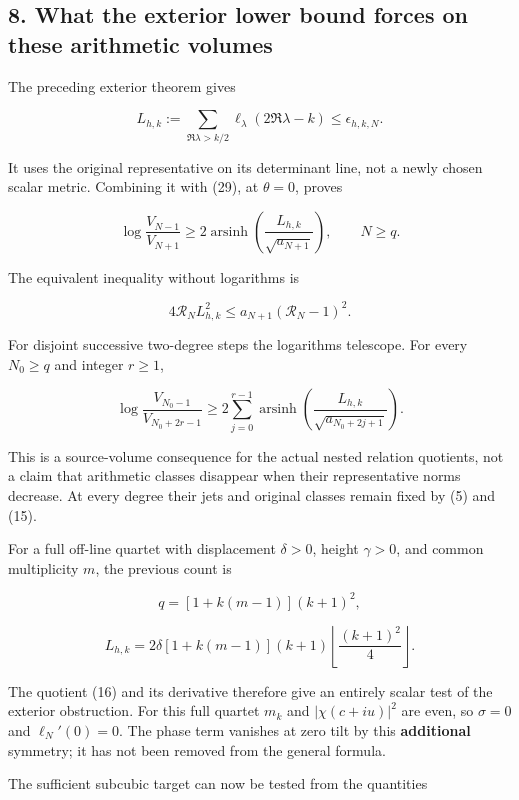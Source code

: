 \subsection{8. What the exterior lower bound forces on these arithmetic
volumes}\label{toda_volume:what-the-exterior-lower-bound-forces-on-these-arithmetic-volumes}

The preceding exterior theorem gives

\[
L_{h,k}:=\sum_{\Re\lambda>k/2}\ell_\lambda(2\Re\lambda-k)
\le\epsilon_{h,k,N}.
\]

It uses the original representative on its determinant line, not a newly
chosen scalar metric. Combining it with (29), at \(\theta=0\), proves

\[
\boxed{
\log\frac{V_{N-1}}{V_{N+1}}
\ge2\operatorname{arsinh}\!\left(\frac{L_{h,k}}{\sqrt{a_{N+1}}}\right),\qquad N\ge q.
}
\tag{30}
\]

The equivalent inequality without logarithms is

\[
4\mathcal R_N L_{h,k}^2\le a_{N+1}(\mathcal R_N-1)^2.
\]

For disjoint successive two-degree steps the logarithms telescope. For
every \(N_0\ge q\) and integer \(r\ge1\),

\[
\boxed{
\log\frac{V_{N_0-1}}{V_{N_0+2r-1}}
\ge 2\sum_{j=0}^{r-1}
\operatorname{arsinh}\!\left(
\frac{L_{h,k}}{\sqrt{a_{N_0+2j+1}}}\right).
}
\tag{31}
\]

This is a source-volume consequence for the actual nested relation
quotients, not a claim that arithmetic classes disappear when their
representative norms decrease. At every degree their jets and original
classes remain fixed by (5) and (15).

For a full off-line quartet with displacement \(\delta>0\), height
\(\gamma>0\), and common multiplicity \(m\), the previous count is

\[
q=[1+k(m-1)](k+1)^2,
\]

\[
L_{h,k}=2\delta[1+k(m-1)](k+1)
\left\lfloor\frac{(k+1)^2}{4}\right\rfloor.
\tag{32}
\]

The quotient (16) and its derivative therefore give an entirely scalar
test of the exterior obstruction. For this full quartet \(m_k\) and
\(|\chi(c+iu)|^2\) are even, so \(\sigma=0\) and \(\ell_N'(0)=0\). The
phase term vanishes at zero tilt by this \textbf{additional} symmetry;
it has not been removed from the general formula.

The sufficient subcubic target can now be tested from the quantities

